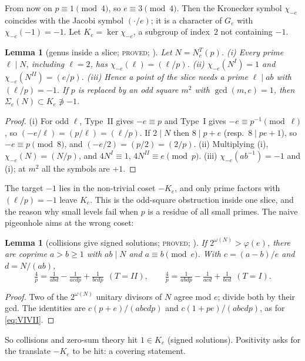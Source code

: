 \documentclass[10pt,reqno]{amsart}
\newtheorem{lemma}[theorem]{Lemma}
\theoremstyle{definition}
\numberwithin{equation}{section}
\newcommand{\status}[1]{\textup{\textsc{#1}}}
\begin{document}
From now on $p\equiv1\pmod4$, so $e\equiv3\pmod4$. Then the Kronecker
symbol $\chi_{-e}$ coincides with the Jacobi symbol $(\cdot/e)$; it is a
character of $G_e$ with $\chi_{-e}(-1)=-1$. Let $K_e=\ker\chi_{-e}$, a
subgroup of index~$2$ not containing $-1$.

\begin{lemma}[genus inside a slice; \status{proved}; {\cite[Lemma~1.2]{LP}}]\label{lem:eslicegenus}
Let $N=N_e^T(p)$. \textup{(i)} Every prime $\ell\mid N$, including
$\ell=2$, has $\chi_{-e}(\ell)=(\ell/p)$. \textup{(ii)} $\chi_{-e}(N^I)=1$
and $\chi_{-e}(N^{II})=(e/p)$. \textup{(iii)} Hence a point of the slice
needs a prime $\ell\mid ab$ with $(\ell/p)=-1$. If $p$ is replaced by an odd
square $m^2$ with $\gcd(m,e)=1$, then $\Sigma_e(N)\subset K_e\not\ni-1$.
\end{lemma}
\begin{proof}
(i) For odd $\ell$, Type~II gives $-e\equiv p$ and Type~I gives
$-e\equiv p^{-1}\pmod\ell$, so $(-e/\ell)=(p/\ell)=(\ell/p)$. If $2\mid N$
then $8\mid p+e$ (resp.\ $8\mid pe+1$), so $-e\equiv p\pmod8$, and
$(-e/2)=(p/2)=(2/p)$. (ii) Multiplying (i), $\chi_{-e}(N)=(N/p)$, and
$4N^I\equiv1$, $4N^{II}\equiv e\pmod p$. (iii) $\chi_{-e}(ab^{-1})=-1$ and (i);
at $m^2$ all the symbols are $+1$.
\end{proof}
The target $-1$ lies in the non-trivial coset $-K_e$, and only prime
factors with $(\ell/p)=-1$ leave $K_e$. This is the odd-square obstruction
\cite[Prop.~1.6]{ET} inside one slice, and the reason why small levels
fail when $p$ is a residue of all small primes. The naive pigeonhole
aims at the wrong coset:

\begin{lemma}[collisions give signed solutions; \status{proved}; {\cite[Lemma~1.3]{LP}}]\label{lem:collide}
If $2^{\omega(N)}>\varphi(e)$, there are coprime $a>b\ge1$ with $ab\mid N$ and
$a\equiv b\pmod e$. With $c=(a-b)/e$ and $d=N/(ab)$,
\[\tfrac4p=\tfrac1{abd}-\tfrac1{acdp}+\tfrac1{bcdp}\ \ (T=II),\qquad
\tfrac4p=\tfrac1{abdp}-\tfrac1{acd}+\tfrac1{bcd}\ \ (T=I).\]
\end{lemma}
\begin{proof}
Two of the $2^{\omega(N)}$ unitary divisors of $N$ agree mod $e$; divide
both by their gcd. The identities are $c(p+e)/(abcdp)$ and
$c(1+pe)/(abcdp)$, as for \eqref{eq:VIVII}.
\end{proof}
So collisions and zero-sum theory hit $1\in K_e$ (signed solutions).
Positivity asks for the translate $-K_e$ to be hit: a covering statement.
\end{document}
